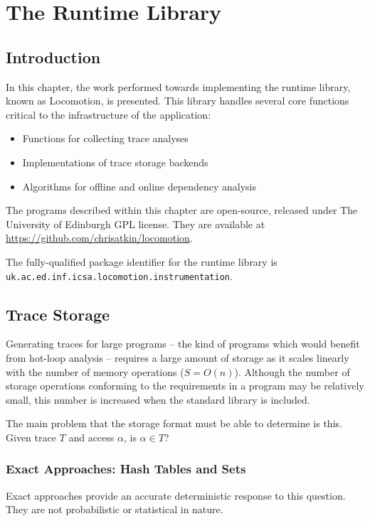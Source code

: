 \chapter{The Runtime Library} \label{chp:runtime}
\section{Introduction} \label{sec:runtime/introduction}
In this chapter, the work performed towards implementing the runtime library, known as Locomotion, is presented. This library handles several core functions critical to the infrastructure of the application:

\begin{itemize}
	\item Functions for collecting trace analyses
	\item Implementations of trace storage backends
	\item Algorithms for offline and online dependency analysis
\end{itemize}

The programs described within this chapter are open-source, released under The University of Edinburgh GPL license. They are available at \url{https://github.com/chrisatkin/locomotion}.

The fully-qualified package identifier for the runtime library is\\\texttt{uk.ac.ed.inf.icsa.locomotion.instrumentation}.

\section{Trace Storage} \label{sec:runtime/storage}
Generating traces for large programs -- the kind of programs which would benefit from hot-loop analysis -- requires a large amount of storage as it scales linearly with the number of memory operations ($S=O(n)$). Although the number of storage operations conforming to the requirements in a program may be relatively small, this number is increased when the standard library is included.

The main problem that the storage format must be able to determine is this. Given trace $T$ and access $\alpha$, is $\alpha \in T$?
	
	\subsection{Exact Approaches: Hash Tables and Sets} \label{sec:runtime/storage/exact}
	Exact approaches provide an accurate deterministic response to this question. They are not probabilistic or statistical in nature.


